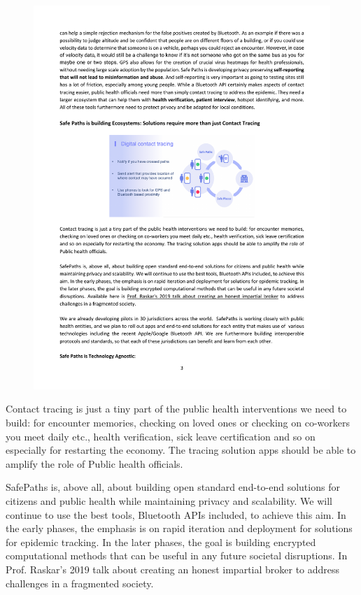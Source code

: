 \documentclass[11pt]{article}
\begin{document}
\begin{figure}[h]
\centering
\includegraphics{main_fig}
\end{figure}


Contact tracing is just a tiny part of the public health interventions we need to build: for encounter memories, checking on loved ones or checking on co-workers you meet daily etc., health verification, sick leave certification and so on especially for restarting the economy. The tracing solution apps should be able to amplify the role of Public health officials. 

SafePaths is, above all, about building open standard end-to-end solutions for citizens and public health while maintaining privacy and scalability. We will continue to use the best tools, Bluetooth APIs included, to achieve this aim. In the early phases, the emphasis is on rapid iteration and deployment for solutions for epidemic tracking. In the later phases, the goal is building encrypted computational methods that can be useful in any future societal disruptions. In \cite{ramesh} Prof. Raskar's 2019 talk about creating an honest impartial broker to address challenges in a fragmented society.
\end{document}
